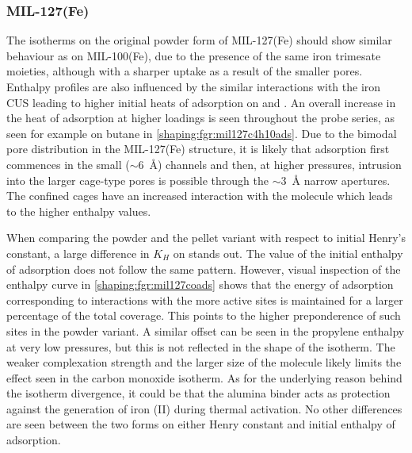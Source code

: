 
\subsubsection{MIL-127(Fe)}

The isotherms on the original powder form of MIL-127(Fe)
should show similar behaviour as on MIL-100(Fe),
due to the presence of the same iron trimesate moieties,
although with a sharper uptake as a result of the smaller pores. Enthalpy
profiles are also influenced by the similar interactions with the iron
CUS leading to higher initial heats of adsorption on  and .
An overall increase in the heat of adsorption at higher loadings is seen
throughout the probe series, as seen for example on butane in
\autoref{shaping:fgr:mil127c4h10ads}.
Due to the bimodal pore distribution in the MIL-127(Fe) structure,
it is likely that adsorption first commences in the small
(\( \sim \)\SI{6}{\angstrom}) channels and then, at higher pressures,
intrusion into the larger cage-type pores is possible through the
\( \sim \)\SI{3}{\angstrom} narrow apertures.
The confined cages have an increased interaction with the molecule
which leads to the higher enthalpy values.

When comparing the powder and the pellet variant with respect to
initial Henry's constant, a large difference in \(K_H\) on 
stands out. The value of the initial enthalpy of adsorption
does not follow the same pattern.
However, visual inspection of the enthalpy curve in
\autoref{shaping:fgr:mil127coads} shows that the energy of
adsorption corresponding to
interactions with the more active sites is maintained for a larger
percentage of the total coverage.
This points to the higher preponderence of such sites in the powder
variant. A similar offset can be seen in the propylene enthalpy at very
low pressures, but this is not reflected in the shape of the isotherm.
The weaker complexation strength and the larger size of the molecule
likely limits the effect seen in the carbon monoxide isotherm.
As for the underlying reason behind the isotherm divergence, it
could be that the alumina binder acts as protection against the
generation of iron (II) during thermal activation.
No other differences are seen between the two forms on either Henry
constant and initial enthalpy of adsorption.

